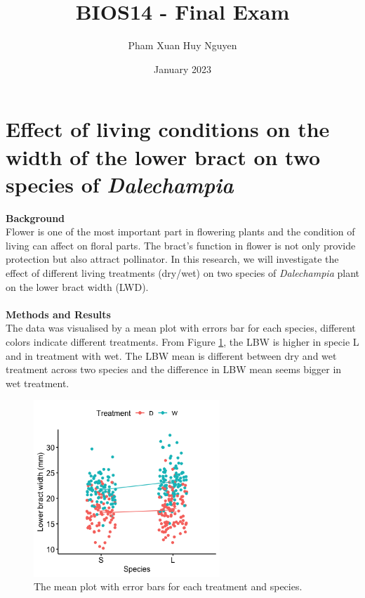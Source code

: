 \documentclass{article}
\title{BIOS14 - Final Exam}
\author{Pham Xuan Huy Nguyen}
\date{January 2023}
\begin{document}
\maketitle

\section{Effect of living conditions on the width of the lower bract on two species of \textit{Dalechampia}}
\textbf{Background}\\

Flower is one of the most important part in flowering plants and the condition of living can affect on floral parts. The bract's function in flower is not only provide protection but also attract pollinator. In this research, we will investigate the effect of different living treatments (dry/wet) on two species of \textit{Dalechampia} plant on the lower bract width (LWD).\\
\\
\textbf{Methods and Results}\\

The data was visualised by a mean plot with errors bar for each species, different colors indicate different treatments. From Figure \ref{fig1}, the LBW is higher in specie L and in treatment with wet. The LBW mean is different between dry and wet treatment across two species and the difference in LBW mean seems bigger in wet treatment.\\
\begin{figure}[h!]
\begin{center}
  \includegraphics[width=70mm]{images/1_1.png}
\end{center}
  \caption{The mean plot with error bars for each treatment and species.}
  \label{fig1}
\end{figure}
\end{document}
